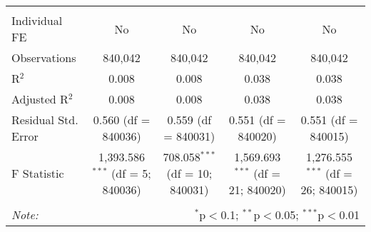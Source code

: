 \documentclass[
]{article}
\begin{document}
\begin{table}[!htbp]
{\begin{tabular}{@{\extracolsep{5pt}}lcccc}
\hline \\[-1.8ex] 
Individual FE & No & No & No & No \\ 
Observations & 840,042 & 840,042 & 840,042 & 840,042 \\ 
R$^{2}$ & 0.008 & 0.008 & 0.038 & 0.038 \\ 
Adjusted R$^{2}$ & 0.008 & 0.008 & 0.038 & 0.038 \\ 
Residual Std. Error & 0.560 (df = 840036) & 0.559 (df = 840031) & 0.551 (df = 840020) & 0.551 (df = 840015) \\ 
F Statistic & 1,393.586$^{***}$ (df = 5; 840036) & 708.058$^{***}$ (df = 10; 840031) & 1,569.693$^{***}$ (df = 21; 840020) & 1,276.555$^{***}$ (df = 26; 840015) \\ 
\hline 
\hline \\[-1.8ex] 
\textit{Note:}  & \multicolumn{4}{r}{$^{*}$p$<$0.1; $^{**}$p$<$0.05; $^{***}$p$<$0.01} \\ 
\end{tabular}
} 
\end{table} 
\newpage
\end{document}
